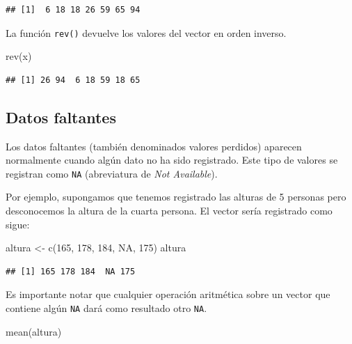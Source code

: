 \documentclass[
]{book}
\newenvironment{Shaded}{\begin{snugshade}}{\end{snugshade}}
\newcommand{\ConstantTok}[1]{\textcolor[rgb]{0.00,0.00,0.00}{#1}}
\newcommand{\DecValTok}[1]{\textcolor[rgb]{0.00,0.00,0.81}{#1}}
\newcommand{\FunctionTok}[1]{\textcolor[rgb]{0.00,0.00,0.00}{#1}}
\newcommand{\NormalTok}[1]{#1}
\newcommand{\OtherTok}[1]{\textcolor[rgb]{0.56,0.35,0.01}{#1}}
\theoremstyle{break}
\theoremstyle{nonumberplain}
\begin{document}
\begin{verbatim}
## [1]  6 18 18 26 59 65 94
\end{verbatim}

La función \texttt{rev()} devuelve los valores del vector en orden inverso.

\begin{Shaded}
\begin{Highlighting}[]
\FunctionTok{rev}\NormalTok{(x)}
\end{Highlighting}
\end{Shaded}

\begin{verbatim}
## [1] 26 94  6 18 59 18 65
\end{verbatim}

\hypertarget{datos-faltantes}{%
\subsection{Datos faltantes}\label{datos-faltantes}}

Los datos faltantes (también denominados valores perdidos) aparecen normalmente cuando algún dato no ha sido registrado.
Este tipo de valores se registran como \texttt{NA} (abreviatura de \emph{Not Available}).

Por ejemplo, supongamos que tenemos registrado las alturas de 5 personas pero desconocemos la altura de la cuarta persona.
El vector sería registrado como sigue:

\begin{Shaded}
\begin{Highlighting}[]
\NormalTok{altura }\OtherTok{\textless{}{-}} \FunctionTok{c}\NormalTok{(}\DecValTok{165}\NormalTok{, }\DecValTok{178}\NormalTok{, }\DecValTok{184}\NormalTok{, }\ConstantTok{NA}\NormalTok{, }\DecValTok{175}\NormalTok{)}
\NormalTok{altura}
\end{Highlighting}
\end{Shaded}

\begin{verbatim}
## [1] 165 178 184  NA 175
\end{verbatim}

Es importante notar que cualquier operación aritmética sobre un vector
que contiene algún \texttt{NA} dará como resultado otro \texttt{NA}.

\begin{Shaded}
\begin{Highlighting}[]
\FunctionTok{mean}\NormalTok{(altura)}
\end{Highlighting}
\end{Shaded}
\end{document}

